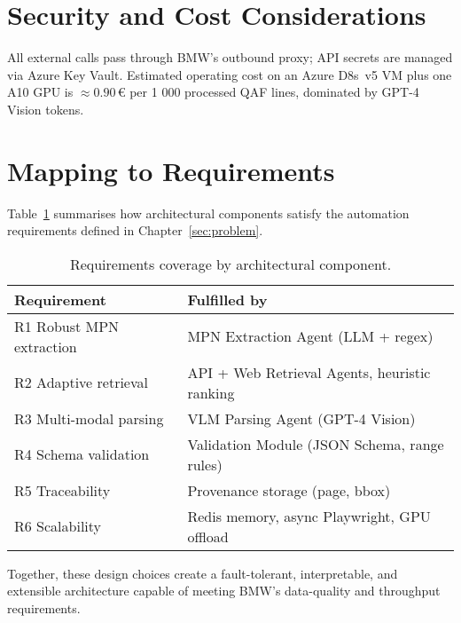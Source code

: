 \section{Security and Cost Considerations}
All external calls pass through BMW’s outbound proxy; API secrets are managed via Azure Key Vault.  
Estimated operating cost on an Azure D8s~v5 VM plus one A10 GPU is \(\approx 0.90\,€\) per 1 000 processed QAF lines, dominated by GPT-4 Vision tokens.

\section{Mapping to Requirements}
Table~\ref{tab:reqmap} summarises how architectural components satisfy the automation requirements defined in Chapter~\ref{sec:problem}.

\begin{table}[ht]
  \centering
  \caption{Requirements coverage by architectural component.}
  \label{tab:reqmap}
  \begin{tabular}{ll}
    \hline
    Requirement & Fulfilled by \\\hline
    R1 Robust MPN extraction & MPN Extraction Agent (LLM + regex) \\
    R2 Adaptive retrieval    & API + Web Retrieval Agents, heuristic ranking \\
    R3 Multi-modal parsing   & VLM Parsing Agent (GPT-4 Vision) \\
    R4 Schema validation     & Validation Module (JSON Schema, range rules) \\
    R5 Traceability          & Provenance storage (page, bbox) \\
    R6 Scalability           & Redis memory, async Playwright, GPU offload \\\hline
  \end{tabular}
\end{table}

Together, these design choices create a fault-tolerant, interpretable, and extensible architecture capable of meeting BMW’s data-quality and throughput requirements.
